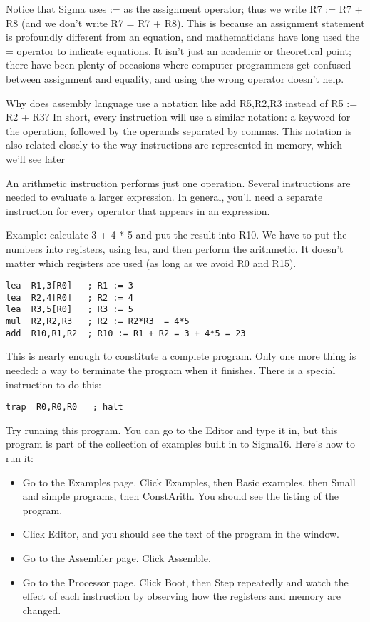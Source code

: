 \documentclass[11pt]{article}
\begin{document}
\begin{itemize}
Notice that Sigma uses := as the assignment operator; thus we write R7
:= R7 + R8 (and we don't write R7 = R7 + R8).  This is because an
assignment statement is profoundly different from an equation, and
mathematicians have long used the = operator to indicate equations.
It isn't just an academic or theoretical point; there have been plenty
of occasions where computer programmers get confused between
assignment and equality, and using the wrong operator doesn't help.

Why does assembly language use a notation like add R5,R2,R3 instead of
R5 := R2 + R3?  In short, every instruction will use a similar
notation: a keyword for the operation, followed by the operands
separated by commas.  This notation is also related closely to the way
instructions are represented in memory, which we'll see later

An arithmetic instruction performs just one operation.  Several
instructions are needed to evaluate a larger expression.  In general,
you'll need a separate instruction for every operator that appears in
an expression.

Example: calculate 3 + 4 * 5 and put the result into R10.  We have to
put the numbers into registers, using lea, and then perform the
arithmetic.  It doesn't matter which registers are used (as long as we
avoid R0 and R15).

\begin{verbatim}
lea  R1,3[R0]   ; R1 := 3
lea  R2,4[R0]   ; R2 := 4
lea  R3,5[R0]   ; R3 := 5
mul  R2,R2,R3   ; R2 := R2*R3  = 4*5
add  R10,R1,R2  ; R10 := R1 + R2 = 3 + 4*5 = 23
\end{verbatim}

This is nearly enough to constitute a complete program.  Only one more
thing is needed: a way to terminate the program when it finishes.
There is a special instruction to do this:

\begin{verbatim}
trap  R0,R0,R0   ; halt
\end{verbatim}

Try running this program.  You can go to the Editor and type it in,
but this program is part of the collection of examples built in to
Sigma16.  Here's how to run it:

\begin{itemize}
\item Go to the Examples page.  Click Examples, then Basic examples, then
Small and simple programs, then ConstArith.  You should see the
listing of the program.
\item Click Editor, and you should see the text of the program in the
window.
\item Go to the Assembler page.  Click Assemble.
\item Go to the Processor page.  Click Boot, then Step repeatedly and
watch the effect of each instruction by observing how the registers
and memory are changed.
\end{itemize}


\end{itemize}
\end{document}

